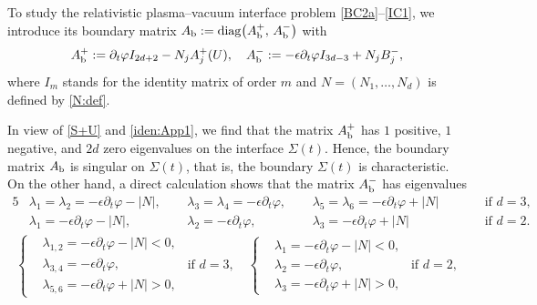 \documentclass[twoside,11pt]{article}
\numberwithin{equation}{section}
\def\p{\partial}
\begin{document}
	
	To study the relativistic plasma--vacuum interface problem \eqref{BC2a}--\eqref{IC1}, we introduce its boundary matrix
	$A_{\rm b}:=\mathrm{diag}\big(A_{\rm b}^+,\, A_{\rm b}^-\big)$ with
	\begin{align}
	\label{Ab:def}	
		A_{\rm b}^+:=\p_t\varphi I_{2d+2}-N_jA_j^+(U),\quad
		A_{\rm b}^-:=-\epsilon\p_t\varphi I_{3d-3}+N_jB_j^-,
	\end{align}
	where $I_m$ stands for  the identity matrix of order $m$
	and $N=(N_1,\ldots,N_d)$ is defined by \eqref{N:def}.

	In view of \eqref{S+U} and \eqref{iden:App1},
	we find that the matrix $A_{\rm b}^+$ has $1$ positive, $1$ negative, and $2d$ zero eigenvalues on the interface $\Sigma(t)$.
	Hence, the boundary matrix $A_{\rm b}$ is singular on $\Sigma(t)$, that is, the boundary $\Sigma(t)$ is characteristic.
	On the other hand, a direct calculation shows that the matrix $A_{\rm b}^-$ has eigenvalues
\begin{alignat}{5} \nonumber %
&\lambda_{1 }=\lambda_{2}=-\epsilon\p_t\varphi-|N| , \ \ &&\lambda_{3 }=\lambda_{4}=-\epsilon\p_t\varphi,\ \ && \lambda_{5}=\lambda_{6}=-\epsilon\p_t\varphi+|N| \qquad   &&\textrm{if }d=3,\\[1mm]
&\lambda_{1}=-\epsilon\p_t\varphi-|N| ,\ \ &&
\lambda_{2}=-\epsilon\p_t\varphi, \ \ &&
  \lambda_{3}=-\epsilon\p_t\varphi+|N|\qquad  &&\textrm{if }d=2.
		\nonumber
\end{alignat}		
	\iffalse 	
\begin{align} \nonumber %
	\left\{
	\begin{aligned}
		&\lambda_{1,2}=-\epsilon\p_t\varphi-|N|<0, \\
		& \lambda_{3,4}=-\epsilon\p_t\varphi,\\
		& \lambda_{5,6}=-\epsilon\p_t\varphi+|N|>0,
	\end{aligned}
	\right.\ \  \textrm{if }d=3,\quad
	\left\{
	\begin{aligned}
		& \lambda_{1}=-\epsilon\p_t\varphi-|N|<0,\\
		& \lambda_{2}=-\epsilon\p_t\varphi, \\
		& \lambda_{3}=-\epsilon\p_t\varphi+|N|>0,
	\end{aligned}
	\right.\ \ \textrm{if }d=2,
\end{align}	
\end{document}
